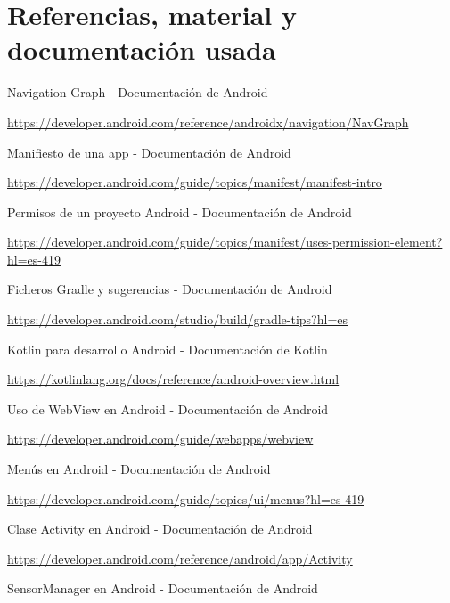 \section{Referencias, material y documentación usada}


\begin{thebibliography}{9}


	Navigation Graph - Documentación de Android

	\url{https://developer.android.com/reference/androidx/navigation/NavGraph}


	Manifiesto de una app - Documentación de Android

	\url{https://developer.android.com/guide/topics/manifest/manifest-intro}


	Permisos de un proyecto Android - Documentación de Android

	\url{https://developer.android.com/guide/topics/manifest/uses-permission-element?hl=es-419}


	Ficheros Gradle y sugerencias - Documentación de Android

	\url{https://developer.android.com/studio/build/gradle-tips?hl=es}


	Kotlin para desarrollo Android - Documentación de Kotlin

	\url{https://kotlinlang.org/docs/reference/android-overview.html}


	Uso de WebView en Android - Documentación de Android

	\url{https://developer.android.com/guide/webapps/webview}


	Menús en Android - Documentación de Android

	\url{https://developer.android.com/guide/topics/ui/menus?hl=es-419}


	Clase Activity en Android - Documentación de Android

	\url{https://developer.android.com/reference/android/app/Activity}


	SensorManager en Android - Documentación de Android


\end{thebibliography}

